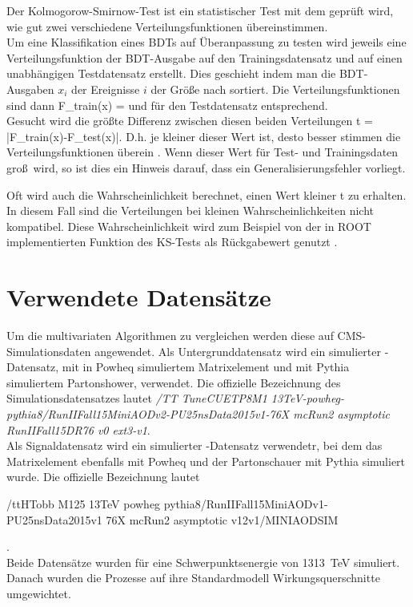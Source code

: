 Der Kolmogorow-Smirnow-Test ist ein statistischer Test mit dem gepr\"uft wird, wie gut zwei verschiedene Verteilungsfunktionen \"ubereinstimmen.\\
Um eine Klassifikation eines BDTs auf \"Uberanpassung zu testen wird jeweils eine Verteilungsfunktion der BDT-Ausgabe auf den Trainingsdatensatz und auf einen unabh\"angigen Testdatensatz erstellt. Dies geschieht indem man die BDT-Ausgaben $x_i$ der Ereignisse $i$ der Gr\"o\ss e nach sortiert. Die Verteilungsfunktionen sind dann
\beq
F_{train}(x) = 
\label{eq:CDF_train}
\eeq
und f\"ur den Testdatensatz entsprechend.\\
Gesucht wird die gr\"o\ss te Differenz zwischen diesen beiden Verteilungen
\beq
t = \cdot\max\left|F_{train}(x)-F_{test}(x)\right|.
\label{eq:KSTest}
\eeq
D.h. je kleiner dieser Wert ist, desto besser stimmen die Verteilungsfunktionen \"uberein \cite{Blobel}. Wenn dieser Wert f\"ur Test- und Trainingsdaten gro\ss~wird, so ist dies ein Hinweis darauf, dass ein Generalisierungsfehler vorliegt.

Oft wird auch die Wahrscheinlichkeit berechnet, einen Wert kleiner t zu erhalten. In diesem Fall sind die Verteilungen bei kleinen Wahrscheinlichkeiten nicht kompatibel. Diese Wahrscheinlichkeit wird zum Beispiel von der in ROOT implementierten Funktion des KS-Tests als R\"uckgabewert genutzt \cite{ROOT:TH1F}.

\section{Verwendete Datens\"atze}
\label{ch:Vergleich:sec:Daten}

Um die multivariaten Algorithmen zu vergleichen werden diese auf CMS-Simulationsdaten angewendet. Als Untergrunddatensatz wird ein simulierter \ttb-Datensatz, mit in Powheq simuliertem Matrixelement \cite{} und mit Pythia simuliertem Partonshower, verwendet. Die offizielle Bezeichnung des Simulationsdatensatzes lautet {\it/TT TuneCUETP8M1 13TeV-powheg-pythia8/RunIIFall15MiniAODv2-PU25nsData2015v1-76X mcRun2 asymptotic RunIIFall15DR76 v0 ext3-v1}.\\
Als Signaldatensatz wird ein simulierter \ttH-Datensatz verwendetr, bei dem das Matrixelement ebenfalls mit Powheq und der Partonschauer mit Pythia simuliert wurde. Die offizielle Bezeichnung lautet \begin{it}/ttHTobb M125 13TeV powheg pythia8/RunIIFall15MiniAODv1-PU25nsData2015v1 76X mcRun2 asymptotic v12v1/MINIAODSIM\end{it}.\\
Beide Datens\"atze wurden f\"ur eine Schwerpunktsenergie von \num{13}\si{13\tera\electronvolt} simuliert. Danach wurden die Prozesse auf ihre Standardmodell Wirkungsquerschnitte umgewichtet.

